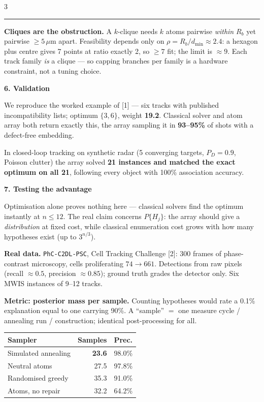 \documentclass{article}
\newcommand{\sectfont}{\fontsize{28}{34}\selectfont}
\newcommand{\bodyfont}{\fontsize{19}{23}\selectfont}
\newcommand{\bigfont}{\fontsize{22}{27}\selectfont}
\newcommand{\headsec}[1]{%
  \par\vspace{3.5mm}%
  \colorbox{nbblue}{\begin{minipage}{\dimexpr\linewidth-2\fboxsep\relax}
    \vspace{1mm}\color{white}\sectfont\textbf{#1}\vspace{1mm}
  \end{minipage}}\par\vspace{3mm}}
\newcommand{\keybox}[2]{%
  \par\vspace{2mm}%
  {\color{#1}\rule{\linewidth}{1.2mm}}\par\vspace{-1mm}
  \colorbox{nblight}{\begin{minipage}{\dimexpr\linewidth-2\fboxsep\relax}
    \vspace{1mm}\bodyfont #2\vspace{1mm}
  \end{minipage}}\par\vspace{2mm}}
\begin{document}
\begin{multicols}{3}
\keybox{nbwarm}{\textbf{Cliques are the obstruction.} A $k$-clique needs $k$
atoms pairwise \emph{within} $R_b$ yet pairwise $\ge 5\,\mu$m apart. Feasibility
depends only on $\rho=R_b/d_{\min}\approx2.4$: a hexagon plus centre gives 7
points at ratio exactly 2, so $\ge7$ fit; the limit is $\approx9$. Each track
family \emph{is} a clique --- so capping branches per family is a hardware
constraint, not a tuning choice.}

\headsec{6. Validation}

We reproduce the worked example of [1] --- six tracks with published
incompatibility lists; optimum $\{3,6\}$, weight \textbf{19.2}. Classical solver
and atom array both return exactly this, the array sampling it in
\textbf{93--95\%} of shots with a defect-free embedding.

In closed-loop tracking on synthetic radar (5 converging targets, $P_D=0.9$,
Poisson clutter) the array solved \textbf{21 instances and matched the exact
optimum on all 21}, following every object with 100\% association accuracy.

\headsec{7. Testing the advantage}

Optimisation alone proves nothing here --- classical solvers find the optimum
instantly at $n\le12$. The real claim concerns $P\{H_j\}$: the array should give
a \emph{distribution} at fixed cost, while classical enumeration cost grows with
how many hypotheses exist (up to $3^{n/3}$).

\textbf{Real data.} \texttt{PhC-C2DL-PSC}, Cell Tracking Challenge [2]: 300
frames of phase-contrast microscopy, cells proliferating $74\rightarrow661$.
Detections from raw pixels (recall $\approx0.5$, precision $\approx0.85$); ground
truth grades the detector only. Six MWIS instances of 9--12 tracks.

\textbf{Metric: posterior mass per sample.} Counting hypotheses would rate a
0.1\% explanation equal to one carrying 90\%. A ``sample'' $=$ one measure cycle
/ annealing run / construction; identical post-processing for all.

\vspace{2mm}
{\bigfont
\begin{tabular}{@{}l r r@{}}
\toprule
\textbf{Sampler} & \textbf{Samples} & \textbf{Prec.}\\
\midrule
Simulated annealing      & \textbf{23.6} & 98.0\%\\
\rowcolor{nblight} Neutral atoms      & 27.5 & 97.8\%\\
Randomised greedy        & 35.3 & 91.0\%\\
Atoms, no repair         & 32.2 & 64.2\%\\
\bottomrule
\end{tabular}}
\vspace{1mm}


\end{multicols}
\end{document}
